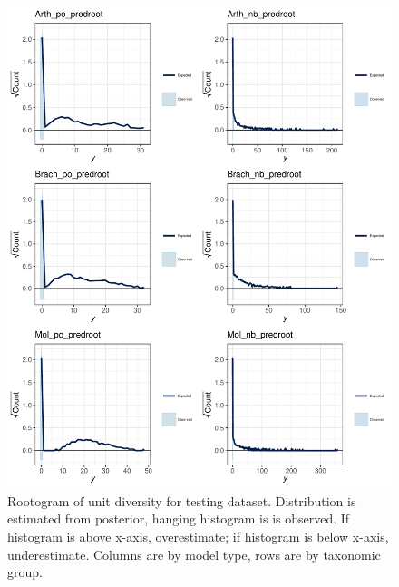 \documentclass[12pt,letterpaper]{article}
\begin{document}
\afterpage{\clearpage}
\begin{figure}[h]
  \centering
  \includegraphics[width=\textwidth,height=0.8\textheight,keepaspectratio=true]{figure/pred_root}
  \caption{Rootogram of unit diversity for testing dataset. Distribution is estimated from posterior, hanging histogram is is observed. If histogram is above x-axis, overestimate; if histogram is below x-axis, underestimate. Columns are by model type, rows are by taxonomic group.}
  \label{fig:pred_root}
\end{figure}
\end{document}

